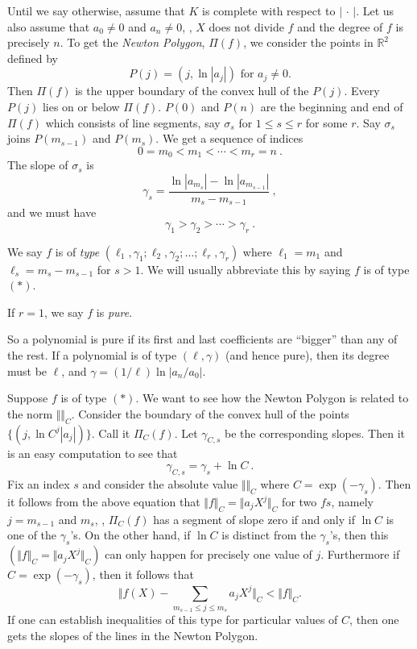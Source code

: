 Until we say otherwise, assume that $K$ is complete with respect to $|\, \cdot\, |$. Let us also assume that $a_{0}\neq 0$ and $a_{n}\neq 0$, \ie, $X$ does not divide $f$ and the degree of $f$ is precisely $n$. To get the {\it Newton Polygon}, $\Pi(f)$, we consider the points in $\mathbb{R}^{2}$ defined by
\begin{equation*}
P(j)=(j,\ln|a_{j}|)\text{ for }a_{j}\neq 0 .
\end{equation*}
Then $\Pi(f)$ is the upper boundary of the convex hull of the $P(j)$. Every $P(j)$ lies on or below $\Pi(f)$. $P(0)$ and $P(n)$ are the beginning and end of $\Pi(f)$ which consists of line segments, say $\sigma_{s}$ for $1\leq s\leq r$ for some $r$. Say $\sigma_{s}$ joins $P(m_{s-1})$ and $P(m_{s})$. We get a sequence of indices
$$
0=m_{0}<m_{1}<\cdots<m_{r}=n\ .
$$
The slope of $\sigma_{s}$ is
$$
\gamma_{s}=\frac{\ln|a_{m_{s}}|-\ln|a_{m_{s-1}}|}{m_{s}-m_{s-1}}\ ,
$$
and we must have
$$
\gamma_{1}>\gamma_{2}>\cdots>\gamma_{r}\ .
$$

\begin{defi}
\label{d3.2.1}
We say $f$ is of {\it type} $(\ell_{1},\gamma_{1};\ell_{2},\gamma_{2};\ldots;\ell_{r},\gamma_{r})$ where $\ell_{1}=m_{1}$ and $\ell_{s}=m_{s}-m_{s-1}$ for $s>1$. We will usually abbreviate this by saying $f$ is of type $(*)$.

If $r=1$, we say $f$ is {\it pure}.
\end{defi}
So a polynomial is pure if its first and last coefficients are ``bigger'' than any of the rest. If a polynomial is of type $(\ell,\gamma)$ (and hence pure), then its degree must be $\ell$, and $\gamma=(1/\ell)\ln|a_{n}/a_{0}|$.

Suppose $f$ is of type $(*)$. We want to see how the Newton Polygon is related to the norm $\Vert\Vert_{C}$. Consider the boundary of the convex hull of the points $\{(j,\ln C^{j}|a_{j}|)\}$. Call it $\Pi_{C}(f)$. Let $\gamma_{C,s}$ be the corresponding slopes. Then it is an easy computation to see that
$$
\gamma_{C,s}=\gamma_{s}+\ln C\ .
$$
Fix an index $s$ and consider the absolute value $\Vert\Vert_{C}$ where $C=\exp(-\gamma_{s})$. Then it follows from the above equation that $\Vert f\Vert_{C}=\Vert a_{j}X^{j}\Vert_{C}$ for two $fs$, namely $j=m_{s-1}$ and $m_{s}$, \ie, $\Pi_{C}(f)$ has a segment of slope zero if and only if $\ln C$ is one of the $\gamma_{s}$'s. On the other hand, if $\ln C$ is distinct from the $\gamma_{s}$'s, then this $(\Vert f\Vert_{C}=\Vert a_{j}X^{j}\Vert_{C})$ can only happen for precisely one value of $j$. Furthermore if $C=\exp(-\gamma_{s})$, then it follows that
\begin{equation}
\label{eq3.32}
\Vert f(X)-\sum_{m_{s-1}\leq j\leq m_{s}}a_{j}X^{j}\Vert_{C}<\Vert f\Vert_{C} .
\end{equation}
If one can establish inequalities of this type for particular values of $C$, then one gets the slopes of the lines in the Newton Polygon.

